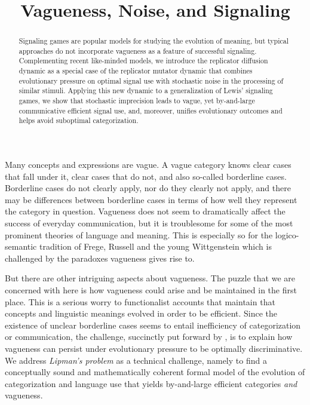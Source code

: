 \documentclass[fleqn,reqno,10pt]{article}
\title{Vagueness, Noise, and Signaling}
\date{}
\begin{document}
\maketitle

\begin{abstract}
  Signaling games are popular models for studying the evolution of
  meaning, but typical approaches do not incorporate vagueness as a
  feature of successful signaling.  Complementing recent like-minded
  models, we introduce the replicator diffusion dynamic as a special
  case of the replicator mutator dynamic that combines evolutionary
  pressure on optimal signal use with stochastic noise in the
  processing of similar stimuli. Applying this new dynamic to a
  generalization of Lewis' signaling games, we show that stochastic
  imprecision leads to vague, yet by-and-large communicative efficient
  signal use, and, moreover, unifies evolutionary outcomes and helps
  avoid suboptimal categorization.
\end{abstract}

Many concepts and expressions are vague. A vague category knows clear
cases that fall under it, clear cases that do not, and also so-called
borderline cases. Borderline cases do not clearly apply, nor do they
clearly not apply, and there may be differences between borderline
cases in terms of how well they represent the category in
question. Vagueness does not seem to dramatically affect the success
of everyday communication, but it is troublesome for some of the most
prominent theories of language and meaning. This is especially so for the logico-semantic tradition of Frege, Russell and the young
Wittgenstein which is challenged by the paradoxes vagueness gives rise
to. 

But there are other intriguing aspects about vagueness. The puzzle
that we are concerned with here is how vagueness could arise and be
maintained in the first place. This is a serious worry to
functionalist accounts that maintain that concepts and linguistic
meanings evolved in order to be efficient. Since the existence of
unclear borderline cases seems to entail inefficiency of
categorization or communication, the challenge, succinctly put forward
by \citet{Lipman2009:Why-is-Language}, is to explain how vagueness can
persist under evolutionary pressure to be optimally discriminative. We
address \emph{Lipman's problem} as a technical challenge, namely to
find a conceptually sound and mathematically coherent formal model of
the evolution of categorization and language use that yields
by-and-large efficient categories \emph{and} vagueness.
\end{document}
